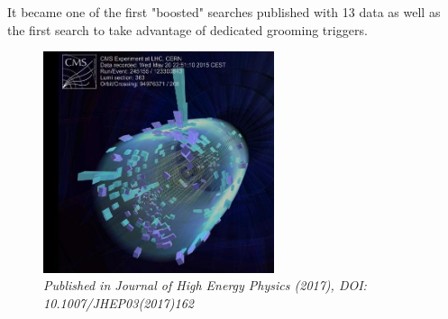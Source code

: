 \begin{centering}
{\newline
It became one of the first "boosted" searches published with 13 \TeV data as well as the first search to take advantage of dedicated grooming triggers.
}
\begin{figure}[b!] 
    \centering
    \includegraphics[height=6.5cm]{figures/analysis/search1/misc/first_coll.png}
    \vspace*{10mm}
    \caption*{\footnotesize{\textit{Published in Journal of High Energy Physics (2017), DOI: 10.1007/JHEP03(2017)162}}}
\end{figure}
\end{centering}

\clearpage

\clearpage


